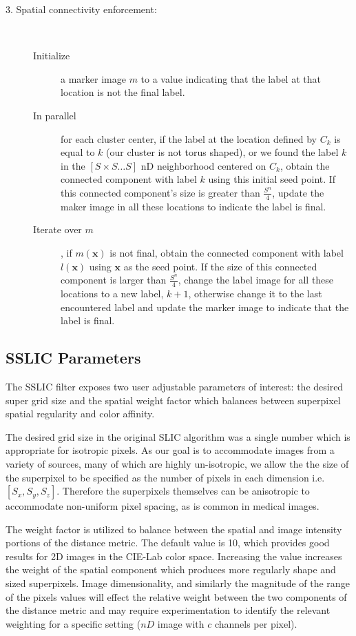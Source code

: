 \documentclass{InsightArticle}
\begin{document}
\begin{description}
\item[3. Spatial connectivity enforcement:]  \hfill  \\[-4mm]
\begin{description}
\item[Initialize] a marker image $m$ to a value indicating that the label
at that location is not the final label. 
\item[In parallel] for each cluster center, if the label at the location defined by
$C_k$ is equal to $k$ (our cluster is not torus shaped), or we found the label $k$ in the   $[S \times S \ldots S]$ nD neighborhood
centered on $C_k$, obtain the connected component with label $k$ using this initial seed point. If this connected component's
size is greater than $\frac{S^n}{4}$, update the maker image in all these locations to indicate the label is final.
\item[Iterate over $m$], if $m(\mathbf{x})$ is not final, obtain the connected component with label $l(\mathbf{x}) $ using $\mathbf{x}$
as the seed point. If the size of this connected component is larger than $\frac{S^n}{4}$, change the label image for all these locations
to a new label, $k+1$, otherwise change it to the last encountered label and update the marker image to indicate that the label is final.

\end{description}
 
\end{description}


\subsection{SSLIC Parameters}

The SSLIC filter exposes two user adjustable parameters of interest: the desired
super grid size and the spatial weight factor which balances between superpixel spatial
regularity and color affinity.

The desired grid size in the original SLIC algorithm was a single number which
is appropriate for isotropic pixels. As our goal  is to accommodate images from
a variety of sources, many of which are highly un-isotropic, we allow the the
size of the superpixel to be specified as the number of pixels in each dimension
i.e. $[S_x, S_y, S_z]$. Therefore the superpixels themselves can be anisotropic
to accommodate non-uniform pixel spacing, as is common in medical images.

The weight factor is utilized to balance between the spatial and image intensity
portions of the distance metric. The default value is 10, which provides good
results for 2D images in the CIE-Lab color space. Increasing the value increases
the weight of the spatial component which produces more regularly shape and
sized superpixels. Image dimensionality, and similarly the magnitude of the
range of the pixels values will effect the relative weight between the two
components of the distance metric and may require experimentation to identify
the relevant weighting for a specific setting ($nD$ image with $c$ channels per
pixel).
\end{document}
